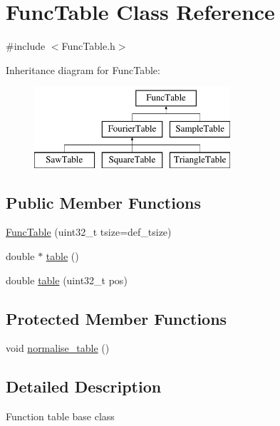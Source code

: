 \hypertarget{class_func_table}{}\section{Func\+Table Class Reference}
\label{class_func_table}


{\ttfamily \#include $<$Func\+Table.\+h$>$}

Inheritance diagram for Func\+Table\+:\begin{figure}[H]
\begin{center}
\leavevmode
\includegraphics[height=3.000000cm]{class_func_table}
\end{center}
\end{figure}
\subsection*{Public Member Functions}
\begin{DoxyCompactItemize}
\item 
\hyperlink{class_func_table_ad76b1221806cebf553bfad4f8b39ac75}{Func\+Table} (uint32\+\_\+t tsize=def\+\_\+tsize)
\item 
double $\ast$ \hyperlink{class_func_table_aad16cb2dbc27ffe7b3b6ed3715657cc4}{table} ()
\item 
double \hyperlink{class_func_table_a6a7a98c7060fed37cf8a6d8823d7e33b}{table} (uint32\+\_\+t pos)
\end{DoxyCompactItemize}
\subsection*{Protected Member Functions}
\begin{DoxyCompactItemize}
\item 
void \hyperlink{class_func_table_af09474fb6b023d82597b940bf60ab71c}{normalise\+\_\+table} ()
\end{DoxyCompactItemize}


\subsection{Detailed Description}
Function table base class 


